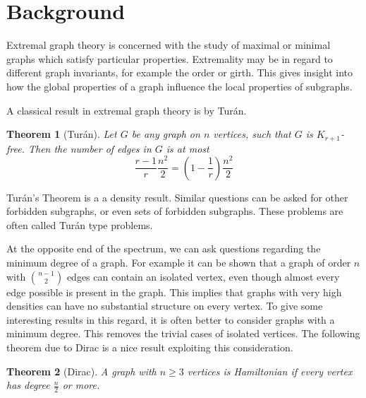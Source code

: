 \documentclass[a4paper]{article}
\newtheorem{theorem}{Theorem}
\begin{document}
\section{Background}
Extremal graph theory is concerned with the study of maximal or minimal graphs which satisfy particular properties. Extremality may be in regard to different graph invariants, for example the order or girth. This gives insight into how the global properties of a graph influence the local properties of subgraphs.

A classical result in extremal graph theory is by Tur\'an.
\begin{theorem}[Tur\'an]
Let $G$ be any graph on $n$ vertices, such that $G$ is $K_{r+1}$-free. Then the number of edges in $G$ is at most $$\frac{r-1}{r}\frac{n^2}{2}=\left (1-\frac{1}{r}\right )\frac{n^2}{2}$$
\end{theorem}

Tur\'an's Theorem is a a density result. Similar questions can be asked for other forbidden subgraphs, or even sets of forbidden subgraphs. These problems are often called Tur\'an type problems.

At the opposite end of the spectrum, we can ask questions regarding the minimum degree of a graph. For example it can be shown that a graph of order $n$ with $\binom{n-1}{2}$ edges can contain an isolated vertex, even though almost every edge possible is present in the graph. This implies that graphs with very high densities can have no substantial structure on every vertex. To give some interesting results in this regard, it is often better to consider graphs with a minimum degree. This removes the trivial cases of isolated vertices. The following theorem due to Dirac is a nice result exploiting this consideration.
\begin{theorem}[Dirac]
A graph with $n\geq 3$ vertices is Hamiltonian if every vertex has degree $\frac{n}{2}$ or more.
\end{theorem}
\end{document}
